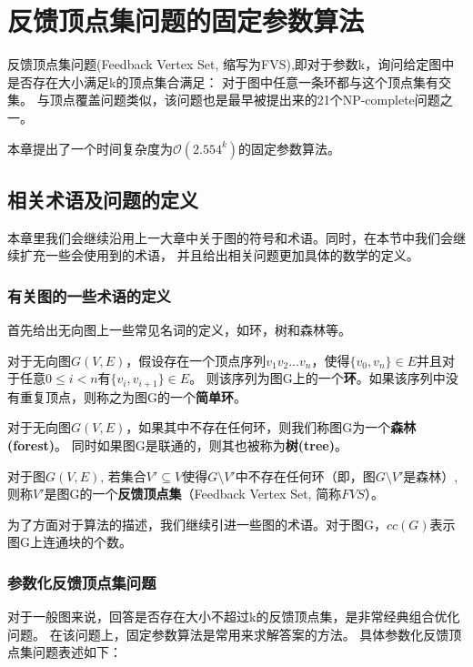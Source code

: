 \chapter{反馈顶点集问题的固定参数算法}
反馈顶点集问题(Feedback Vertex Set, 缩写为FVS),即对于参数k，询问给定图中是否存在大小满足k的顶点集合满足：
对于图中任意一条环都与这个顶点集有交集。
与顶点覆盖问题类似，该问题也是最早被提出来的21个NP-complete问题之一\cite{karp1972reducibility}。

本章提出了一个时间复杂度为$\mathcal{O}(2.554^k)$的固定参数算法。
\section{相关术语及问题的定义}

本章里我们会继续沿用上一大章中关于图的符号和术语。同时，在本节中我们会继续扩充一些会使用到的术语，
并且给出相关问题更加具体的数学的定义。
\subsection{有关图的一些术语的定义}
首先给出无向图上一些常见名词的定义，如环，树和森林等。
\begin{definition}[环]
对于无向图$G(V,E)$，假设存在一个顶点序列$v_1v_2...v_n$，使得$\{v_0, v_n\} \in E$并且对于任意$0 \le i < n$有$\{v_i, v_{i+1}\} \in E$。
则该序列为图G上的一个\textbf{环}。如果该序列中没有重复顶点，则称之为图G的一个\textbf{简单环}。
\end{definition}

\begin{definition}
对于无向图$G(V,E)$，如果其中不存在任何环，则我们称图G为一个\textbf{森林(forest)}。
同时如果图G是联通的，则其也被称为\textbf{树(tree)}。
\end{definition}

\begin{definition}[反馈顶点集]
对于图$G(V, E)$, 若集合$V' \subseteq V$使得$G \setminus V'$中不存在任何环（即，图$G \setminus V'$是森林）,
则称$V'$是图G的一个\textbf{反馈顶点集}（Feedback Vertex Set, 简称$FVS$）。
\end{definition}

为了方面对于算法的描述，我们继续引进一些图的术语。对于图G，$cc(G)$表示图G上连通块的个数。

\subsection{参数化反馈顶点集问题}
对于一般图来说，回答是否存在大小不超过k的反馈顶点集，是非常经典组合优化问题。
在该问题上，固定参数算法是常用来求解答案的方法。
具体参数化反馈顶点集问题表述如下：\\

